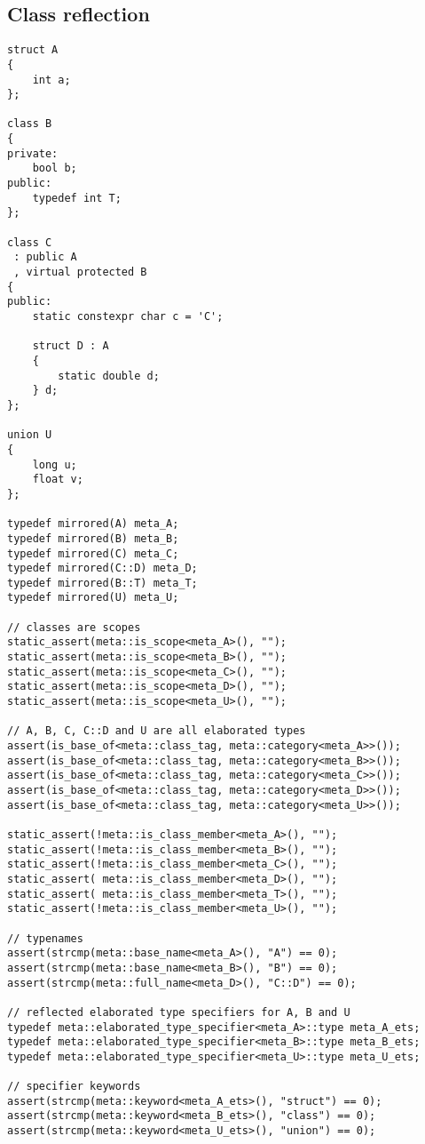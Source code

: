 \subsection{Class reflection}

\begin{verbatim}
struct A
{
	int a;
};

class B
{
private:
	bool b;
public:
	typedef int T;
};

class C
 : public A
 , virtual protected B
{
public:
	static constexpr char c = 'C';

	struct D : A
	{
		static double d;
	} d;
};

union U
{
	long u;
	float v;
};

typedef mirrored(A) meta_A;
typedef mirrored(B) meta_B;
typedef mirrored(C) meta_C;
typedef mirrored(C::D) meta_D;
typedef mirrored(B::T) meta_T;
typedef mirrored(U) meta_U;

// classes are scopes
static_assert(meta::is_scope<meta_A>(), "");
static_assert(meta::is_scope<meta_B>(), "");
static_assert(meta::is_scope<meta_C>(), "");
static_assert(meta::is_scope<meta_D>(), "");
static_assert(meta::is_scope<meta_U>(), "");

// A, B, C, C::D and U are all elaborated types
assert(is_base_of<meta::class_tag, meta::category<meta_A>>());
assert(is_base_of<meta::class_tag, meta::category<meta_B>>());
assert(is_base_of<meta::class_tag, meta::category<meta_C>>());
assert(is_base_of<meta::class_tag, meta::category<meta_D>>());
assert(is_base_of<meta::class_tag, meta::category<meta_U>>());

static_assert(!meta::is_class_member<meta_A>(), "");
static_assert(!meta::is_class_member<meta_B>(), "");
static_assert(!meta::is_class_member<meta_C>(), "");
static_assert( meta::is_class_member<meta_D>(), "");
static_assert( meta::is_class_member<meta_T>(), "");
static_assert(!meta::is_class_member<meta_U>(), "");

// typenames
assert(strcmp(meta::base_name<meta_A>(), "A") == 0);
assert(strcmp(meta::base_name<meta_B>(), "B") == 0);
assert(strcmp(meta::full_name<meta_D>(), "C::D") == 0);

// reflected elaborated type specifiers for A, B and U
typedef meta::elaborated_type_specifier<meta_A>::type meta_A_ets;
typedef meta::elaborated_type_specifier<meta_B>::type meta_B_ets;
typedef meta::elaborated_type_specifier<meta_U>::type meta_U_ets;

// specifier keywords
assert(strcmp(meta::keyword<meta_A_ets>(), "struct") == 0);
assert(strcmp(meta::keyword<meta_B_ets>(), "class") == 0);
assert(strcmp(meta::keyword<meta_U_ets>(), "union") == 0);


\end{verbatim}
